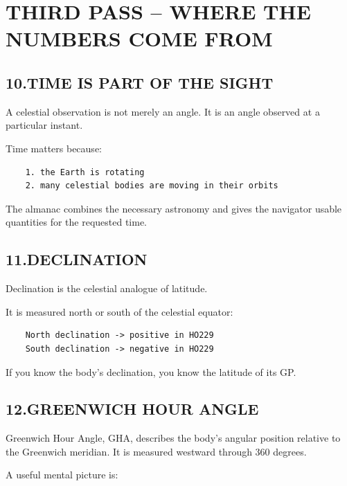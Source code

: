 \documentclass[11pt]{article}
\begin{document}
\section*{THIRD PASS -- WHERE THE NUMBERS COME FROM}

\subsection*{10.\quad TIME IS PART OF THE SIGHT}

A celestial observation is not merely an angle. It is an angle observed at a particular instant.

Time matters because:

\begin{verbatim}
    1. the Earth is rotating
    2. many celestial bodies are moving in their orbits
\end{verbatim}

The almanac combines the necessary astronomy and gives the navigator usable quantities for the requested time.

\subsection*{11.\quad DECLINATION}

Declination is the celestial analogue of latitude.

It is measured north or south of the celestial equator:

\begin{verbatim}
    North declination -> positive in HO229
    South declination -> negative in HO229
\end{verbatim}

If you know the body's declination, you know the latitude of its GP.

\subsection*{12.\quad GREENWICH HOUR ANGLE}

Greenwich Hour Angle, GHA, describes the body's angular position relative to the Greenwich meridian. It is measured westward through 360 degrees.

A useful mental picture is:
\end{document}

